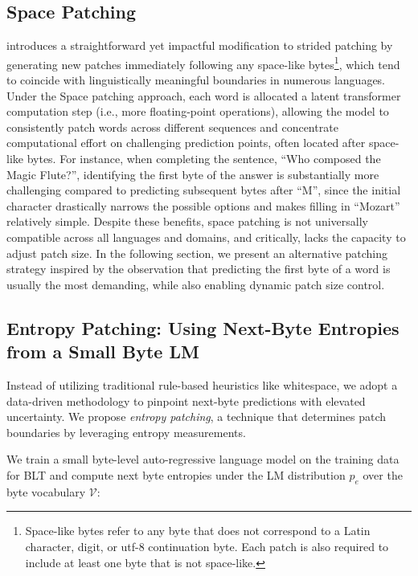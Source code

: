 \subsection{Space Patching}
\label{section:white-patch}

\citet{slagle2024spacebyte} introduces a straightforward yet impactful modification to strided patching by generating new patches immediately following any space-like bytes\footnote{
    Space-like bytes refer to any byte that does not correspond to a Latin character, digit, or utf-8 continuation byte. Each patch is also required to include at least one byte that is not space-like.}, which tend to coincide with linguistically meaningful boundaries in numerous languages. Under the Space patching approach, each word is allocated a latent transformer computation step (i.e., more floating-point operations), allowing the model to consistently patch words across different sequences and concentrate computational effort on challenging prediction points, often located after space-like bytes. For instance, when completing the sentence, ``Who composed the Magic Flute?\uline{\hspace{.6em}}'', identifying the first byte of the answer is substantially more challenging compared to predicting subsequent bytes after ``M'', since the initial character drastically narrows the possible options and makes filling in ``Mozart'' relatively simple. Despite these benefits, space patching is not universally compatible across all languages and domains, and critically, lacks the capacity to adjust patch size. In the following section, we present an alternative patching strategy inspired by the observation that predicting the first byte of a word is usually the most demanding, while also enabling dynamic patch size control.

\subsection{Entropy Patching: Using Next-Byte Entropies from a Small Byte LM}
\label{section:dyn-patch}

Instead of utilizing traditional rule-based heuristics like whitespace, we adopt a data-driven methodology to pinpoint next-byte predictions with elevated uncertainty. We propose \textit{entropy patching}, a technique that determines patch boundaries by leveraging entropy measurements.

We train a small byte-level auto-regressive language model on the training data for {\textsc BLT} and compute next byte entropies under the LM distribution $p_{e}$ over the byte vocabulary $\mathcal{V}$:

